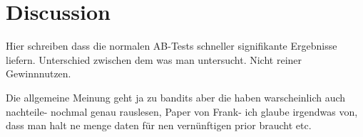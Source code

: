 \documentclass[main.tex]{subfiles}
\begin{document}
\chapter{Discussion}

Hier schreiben dass die normalen AB-Tests schneller signifikante Ergebnisse liefern. Unterschied zwischen dem was man untersucht. Nicht reiner Gewinnnutzen.

Die allgemeine Meinung geht ja zu bandits aber die haben warscheinlich auch nachteile- nochmal genau rauslesen, Paper von Frank- ich glaube irgendwas von, dass man halt ne menge daten für nen vernünftigen prior braucht etc.
\end{document}
